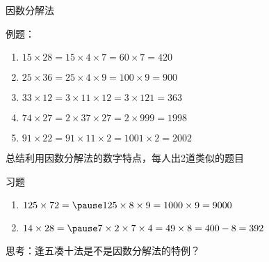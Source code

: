 \documentclass[aspectratio=169]{ctexbeamer} %
\date{\today}
\begin{document}
\begin{frame}[t]{因数分解法}
\begin{spacing}{1.2}
\normalsize
例题：
\begin{enumerate}[label={\arabic*.}]
\item $15 \times 28 = 15 \times 4 \times 7 = 60 \times 7 = 420$
\item $25 \times 36 = 25 \times 4 \times 9 = 100 \times 9 = 900$
\item $33 \times 12 = 3 \times 11 \times 12 = 3 \times 121 = 363$
\item $74 \times 27 = 2 \times 37 \times 27 = 2 \times 999 = 1998$
\item $91 \times 22 = 91 \times 11 \times 2 = 1001 \times 2 = 2002$
\end{enumerate}
\alert{总结利用因数分解法的数字特点，每人出2道类似的题目} \\
\end{spacing}
\end{frame}

\begin{frame}[t]{习题}
\begin{spacing}{1.2}
\normalsize
\begin{enumerate}[label={\arabic*.}]
\item $125 \times 72 = \pause 125 \times 8 \times 9 = 1000 \times 9 = 9000$
\item $14 \times 28 = \pause 7 \times 2 \times 7 \times 4 = 49 \times 8 = 400 - 8 = 392$

\end{enumerate}
\alert{思考：逢五凑十法是不是因数分解法的特例？}
\end{spacing}
\end{frame}
\end{document}
